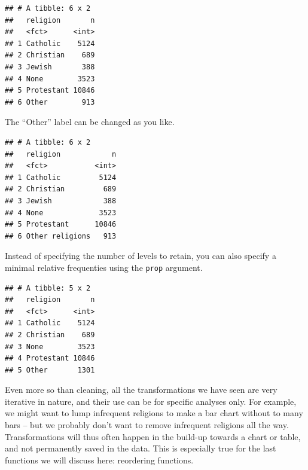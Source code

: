 \documentclass[]{tufte-book}
\newenvironment{Shaded}{}{}
\newcommand{\DataTypeTok}[1]{\textcolor[rgb]{0.56,0.13,0.00}{#1}}
\newcommand{\DecValTok}[1]{\textcolor[rgb]{0.25,0.63,0.44}{#1}}
\newcommand{\FloatTok}[1]{\textcolor[rgb]{0.25,0.63,0.44}{#1}}
\newcommand{\KeywordTok}[1]{\textcolor[rgb]{0.00,0.44,0.13}{\textbf{#1}}}
\newcommand{\NormalTok}[1]{#1}
\newcommand{\OperatorTok}[1]{\textcolor[rgb]{0.40,0.40,0.40}{#1}}
\newcommand{\StringTok}[1]{\textcolor[rgb]{0.25,0.44,0.63}{#1}}
\begin{document}
\begin{verbatim}
## # A tibble: 6 x 2
##   religion       n
##   <fct>      <int>
## 1 Catholic    5124
## 2 Christian    689
## 3 Jewish       388
## 4 None        3523
## 5 Protestant 10846
## 6 Other        913
\end{verbatim}

The ``Other'' label can be changed as you like.

\begin{Shaded}
\end{Shaded}

\begin{verbatim}
## # A tibble: 6 x 2
##   religion            n
##   <fct>           <int>
## 1 Catholic         5124
## 2 Christian         689
## 3 Jewish            388
## 4 None             3523
## 5 Protestant      10846
## 6 Other religions   913
\end{verbatim}

Instead of specifying the number of levels to retain, you can also specify a minimal relative frequenties using the \texttt{prop} argument.

\begin{Shaded}
\end{Shaded}

\begin{verbatim}
## # A tibble: 5 x 2
##   religion       n
##   <fct>      <int>
## 1 Catholic    5124
## 2 Christian    689
## 3 None        3523
## 4 Protestant 10846
## 5 Other       1301
\end{verbatim}

Even more so than cleaning, all the transformations we have seen are very iterative in nature, and their use can be for specific analyses only. For example, we might want to lump infrequent religions to make a bar chart without to many bars -- but we probably don't want to remove infrequent religions all the way. Transformations will thus often happen in the build-up towards a chart or table, and not permanently saved in the data. This is especially true for the last functions we will discuss here: reordering functions.
\end{document}
